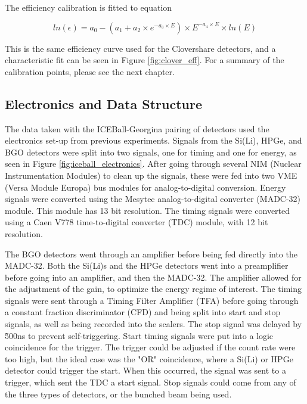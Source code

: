 

The efficiency calibration is fitted to equation

\begin{equation}
    ln(\epsilon) = a_0-(a_1+a_2\times e^{-a_3\times E})\times E^{-a_4\times E}\times ln(E)
    \label{eq:Ge_Eff}
\end{equation}

This is the same efficiency curve used for the Clovershare detectors, and a characteristic fit can be seen in Figure \ref{fig:clover_eff}. For a summary of the calibration points, please see the next chapter.

\subsection{Electronics and Data Structure}
\label{sec:GEORGINA_electronics}

The data taken with the ICEBall-Georgina pairing of detectors used the electronics set-up from previous experiments\citep{battaglia15:_iceball_176lu}. Signals from the Si(Li), HPGe, and BGO detectors were split into two signals, one for timing and one for energy, as seen in Figure \ref{fig:iceball_electronics}. After going through several NIM (Nuclear Instrumentation Modules) to clean up the signals, these were fed into two VME (Versa Module Europa) bus modules for analog-to-digital conversion. Energy signals were converted using the Mesytec analog-to-digital converter (MADC-32) module. This module has 13 bit resolution. The timing signals were converted using a Caen V778 time-to-digital converter (TDC) module, with 12 bit resolution.



The BGO detectors went through an amplifier before being fed directly into the MADC-32. Both the Si(Li)s and the HPGe detectors went into a preamplifier before going into an amplifier, and then the MADC-32. The amplifier allowed for the adjustment of the gain, to optimize the energy regime of interest. The timing signals were sent through a Timing Filter Amplifier (TFA) before going through a constant fraction discriminator (CFD) and being split into start and stop signals, as well as being recorded into the scalers. The stop signal was delayed by \~500ns to prevent self-triggering. Start timing signals were put into a logic coincidence for the trigger. The trigger could be adjusted if the count rate were too high, but the ideal case was the "OR" coincidence, where a Si(Li) or HPGe detector could trigger the start. When this occurred, the signal was sent to a trigger, which sent the TDC a start signal. Stop signals could come from any of the three types of detectors, or the bunched beam being used.

